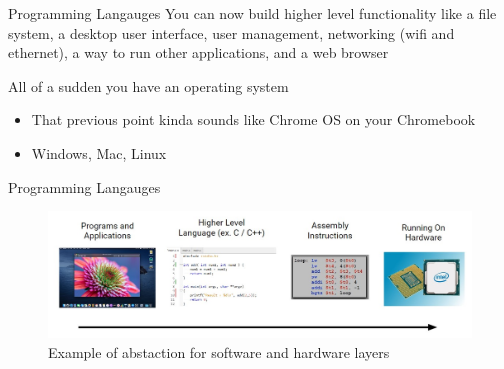 \documentclass[aspectratio=169]{beamer}
\begin{document}
\begin{frame}{Programming Langauges}
    You can now build higher level functionality like a file system, a desktop user interface, user management, networking (wifi and ethernet), a way to run other applications, and a web browser

    \vspace{\baselineskip}
    
    All of a sudden you have an operating system
    \begin{itemize}
        \item That previous point kinda sounds like Chrome OS on your Chromebook
        \item Windows, Mac, Linux
    \end{itemize}

\end{frame}

\begin{frame}{Programming Langauges}

    \begin{figure}
        \centering
        \includegraphics[width=\textwidth]{imgs/vis_8.jpg}
        \\
        Example of abstaction for software and hardware layers
    \end{figure}
\end{frame}
\end{document}
